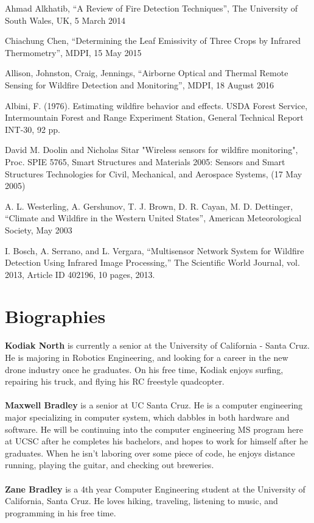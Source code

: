 \documentclass[12pt,journal,compsoc]{IEEEtran}
\begin{document}
\begin{thebibliography}{2}
Ahmad Alkhatib, “A Review of Fire Detection Techniques”, The University of South Wales, UK, 5 March 2014

Chiachung Chen, “Determining the Leaf Emissivity of Three Crops by Infrared Thermometry”, MDPI, 15 May 2015

Allison, Johnston, Craig, Jennings, “Airborne Optical and Thermal Remote Sensing for Wildfire Detection and Monitoring”, MDPI, 18 August 2016

Albini, F. (1976). Estimating wildfire behavior and effects. USDA Forest Service, Intermountain Forest and Range Experiment Station, General Technical Report INT-30, 92 pp.

David M. Doolin and Nicholas Sitar "Wireless sensors for wildfire monitoring", Proc. SPIE 5765, Smart Structures and Materials 2005: Sensors and Smart Structures Technologies for Civil, Mechanical, and Aerospace Systems, (17 May 2005)

A. L. Westerling, A. Gershunov, T. J. Brown, D. R. Cayan, M. D. Dettinger, “Climate and Wildfire in the Western United States”, American Meteorological Society, May 2003

I. Bosch, A. Serrano, and L. Vergara, “Multisensor Network System for Wildfire Detection Using Infrared Image Processing,” The Scientific World Journal, vol. 2013, Article ID 402196, 10 pages, 2013.

\end{thebibliography}

\vspace{1cm}

\section*{Biographies}
\textbf{Kodiak North}
is currently a senior at the University of California - Santa Cruz. He is majoring in Robotics Engineering, and looking for a career in the new drone industry once he graduates. On his free time, Kodiak enjoys surfing, repairing his truck, and flying his RC freestyle quadcopter.\\\\
\noindent
\textbf{Maxwell Bradley}
is a senior at UC Santa Cruz. He is a computer engineering major specializing in computer system, which dabbles in both hardware and software. He will be continuing into the computer engineering MS program here at UCSC after he completes his bachelors, and hopes to work for himself after he graduates. When he isn't laboring over some piece of code, he enjoys distance running, playing the guitar, and checking out breweries.\\\\
\noindent
\textbf{Zane Bradley}
is a 4th year Computer Engineering student at the University of California, Santa Cruz. He loves hiking, traveling, listening to music, and programming in his free time.
\end{document}

